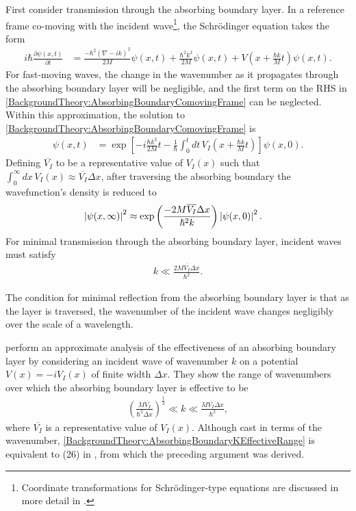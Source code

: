First consider transmission through the absorbing boundary layer. In a reference frame co-moving with the incident wave\footnote{Coordinate transformations for Schrödinger-type equations are discussed in more detail in .}, the Schrödinger equation takes the form
\begin{align}
    \label{BackgroundTheory:AbsorbingBoundaryComovingFrame}
    i \hbar \frac{\partial \psi(x, t)}{\partial t} & = \frac{-\hbar^2\left(\nabla - i k\right)^2}{2M} \psi(x, t) + \frac{\hbar^2 k^2}{2M} \psi(x, t) + V\left(x + \frac{\hbar k}{M}t\right)\psi(x, t).
\end{align}
For fast-moving waves, the change in the wavenumber as it propagates through the absorbing boundary layer will be negligible, and the first term on the RHS in \eqref{BackgroundTheory:AbsorbingBoundaryComovingFrame} can be neglected. Within this approximation, the solution to \eqref{BackgroundTheory:AbsorbingBoundaryComovingFrame} is
\begin{align}
    \psi(x, t) &= \exp\left[-i\frac{\hbar k^2}{2M} t -\frac{1}{\hbar} \int_{0}^t dt\, V_I\left(x + \frac{\hbar k}{M} t\right)\right]\psi(x, 0).
\end{align}
Defining $\overline{V_I}$ to be a representative value of $V_I(x)$ such that $\displaystyle\int_0^\infty dx\, V_I(x)\approx \overline{V_I} \Delta x$, after traversing the absorbing boundary the wavefunction's density is reduced to
\begin{align}
    \left|\psi(x, \infty)\right|^2 &\approx \exp\left( \frac{-2M \overline{V_I} \Delta x}{\hbar^2 k} \right) \left|\psi(x, 0)\right|^2.
\end{align}
For minimal transmission through the absorbing boundary layer, incident waves must satisfy
\begin{align}
    \label{BackgroundTheory:AbsorbingBoundaryMaximumK}
    k \ll \frac{2 M \overline{V_I} \Delta x}{\hbar^2}.
\end{align}

The condition for minimal reflection from the absorbing boundary layer is that as the layer is traversed, the wavenumber of the incident wave changes negligibly over the scale of a wavelength.

 \citet{Neuhasuer:1989} perform an approximate analysis of the effectiveness of an absorbing boundary layer by considering an incident wave of wavenumber $k$ on a potential $V(x) = -i V_I(x)$ of finite width $\Delta x$. They show the range of wavenumbers over which the absorbing boundary layer is effective to be
\begin{align}
    \label{BackgroundTheory:AbsorbingBoundaryKEffectiveRange}
    \left( \frac{M \overline{V_I}}{\hbar^2 \Delta x}\right)^{\frac{1}{3}} \ll k \ll \frac{M \overline{V_I} \Delta x}{\hbar^2},
\end{align}
where $\overline{V_I}$ is a representative value of $V_I(x)$. Although cast in terms of the wavenumber, \eqref{BackgroundTheory:AbsorbingBoundaryKEffectiveRange} is equivalent to (26) in \citep{Neuhasuer:1989}, from which the preceding argument was derived.


